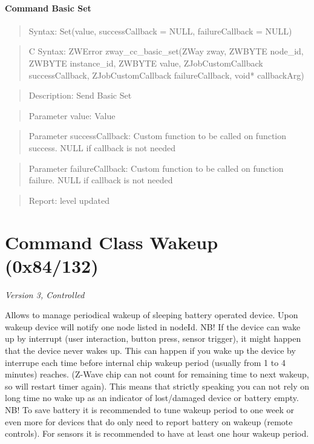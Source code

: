 \paragraph{Command Basic Set}
\begin{quote}Syntax: Set(value, successCallback = NULL, failureCallback = NULL)\end{quote}
\begin{quote}C Syntax: ZWError zway\_cc\_basic\_set(ZWay zway, ZWBYTE node\_id, ZWBYTE instance\_id, ZWBYTE value, ZJobCustomCallback successCallback, ZJobCustomCallback failureCallback, void* callbackArg)\end{quote}
\begin{quote}Description: Send Basic Set\end{quote}
\begin{quote}Parameter value: Value\end{quote}
\begin{quote}Parameter successCallback: Custom function to be called on function success. NULL if callback is not needed\end{quote}
\begin{quote}Parameter failureCallback: Custom function to be called on function failure. NULL if callback is not needed\end{quote}
\begin{quote}Report: level updated\end{quote}


\section{Command Class Wakeup (0x84/132)}

\textit{Version 3, Controlled}
\newline

Allows to manage periodical wakeup of sleeping battery operated device. Upon wakeup device will notify one node listed in nodeId. NB! If the device can wake up by interrupt (user interaction, button press, sensor trigger), it might happen that the device never wakes up. This can happen if you wake up the device by interrupe each time before internal chip wakeup period (usually from 1 to 4 minutes) reaches. (Z-Wave chip can not count for remaining time to next wakeup, so will restart timer again). This means that strictly speaking you can not rely on long time no wake up as an indicator of lost/damaged device or battery empty. NB! To save battery it is recommended to tune wakeup period to one week or even more for devices that do only need to report battery on wakeup (remote controls). For sensors it is recommended to have at least one hour wakeup period.
\newline

